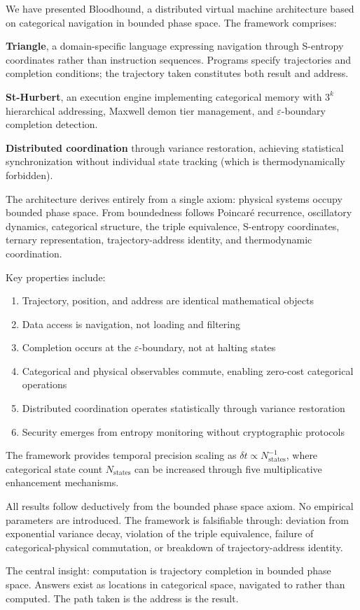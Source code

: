 \documentclass[10pt,twocolumn]{article}
\theoremstyle{definition}
\theoremstyle{remark}
\begin{document}
We have presented Bloodhound, a distributed virtual machine architecture based on categorical navigation in bounded phase space. The framework comprises:

\textbf{Triangle}, a domain-specific language expressing navigation through S-entropy coordinates rather than instruction sequences. Programs specify trajectories and completion conditions; the trajectory taken constitutes both result and address.

\textbf{St-Hurbert}, an execution engine implementing categorical memory with $3^k$ hierarchical addressing, Maxwell demon tier management, and $\varepsilon$-boundary completion detection.

\textbf{Distributed coordination} through variance restoration, achieving statistical synchronization without individual state tracking (which is thermodynamically forbidden).

The architecture derives entirely from a single axiom: physical systems occupy bounded phase space. From boundedness follows Poincar\'{e} recurrence, oscillatory dynamics, categorical structure, the triple equivalence, S-entropy coordinates, ternary representation, trajectory-address identity, and thermodynamic coordination.

Key properties include:

\begin{enumerate}[nosep]
\item Trajectory, position, and address are identical mathematical objects
\item Data access is navigation, not loading and filtering
\item Completion occurs at the $\varepsilon$-boundary, not at halting states
\item Categorical and physical observables commute, enabling zero-cost categorical operations
\item Distributed coordination operates statistically through variance restoration
\item Security emerges from entropy monitoring without cryptographic protocols
\end{enumerate}

The framework provides temporal precision scaling as $\delta t \propto N_{\text{states}}^{-1}$, where categorical state count $N_{\text{states}}$ can be increased through five multiplicative enhancement mechanisms.

All results follow deductively from the bounded phase space axiom. No empirical parameters are introduced. The framework is falsifiable through: deviation from exponential variance decay, violation of the triple equivalence, failure of categorical-physical commutation, or breakdown of trajectory-address identity.

The central insight: computation is trajectory completion in bounded phase space. Answers exist as locations in categorical space, navigated to rather than computed. The path taken is the address is the result.



\end{document}
